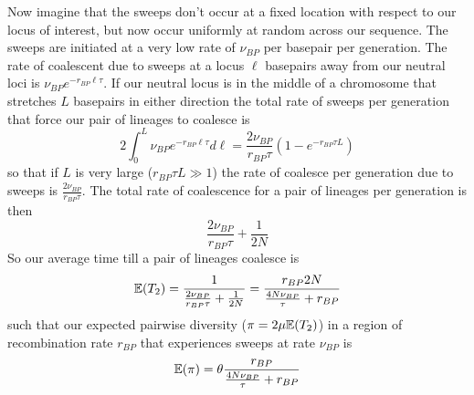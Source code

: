 Now imagine that the sweeps don't occur at a fixed location with
respect to our locus of interest, but now occur uniformly at random
across our sequence. The sweeps are initiated at a very low rate of
$\nu_{BP}$ per basepair per generation. The rate of coalescent due to
sweeps at a locus $\ell$ basepairs away from our neutral loci is
$\nu_{BP} e^{-r_{BP} \ell \tau}$. If our neutral locus is in the
middle of a chromosome that stretches $L$ basepairs in either direction
the total rate of sweeps per generation that force our pair of lineages to coalesce is
\begin{equation}
2\int_0^{L} \nu_{BP} e^{-r_{BP} \ell \tau} d \ell =
\frac{2\nu_{BP}}{r_{BP} \tau} \left(1-e^{-r_{BP} \tau L} \right)
\end{equation}
so that if $L$ is very large ($r_{BP} \tau L \gg 1$) the rate of coalesce per
generation due to sweeps is $\frac{2\nu_{BP}}{r_{BP} \tau}$. The total rate
of coalescence for a pair of lineages per generation is then
\begin{equation}
\frac{2\nu_{BP}}{r_{BP} \tau}+\frac{1}{2N}
\end{equation}
So our average time till a pair of lineages coalesce is
\begin{equation}
\mathbb{E}(T_2) = \frac{1}{\frac{2\nu_{BP}}{r_{BP} \tau}+\frac{1}{2N}} = \frac{r_{BP}2N}{\frac{4N\nu_{BP}}{ \tau}+r_{BP}}
\end{equation}
such that our expected pairwise diversity ($\pi=2\mu\mathbb{E}(T_2)$) in a region of
recombination rate $r_{BP}$ that experiences sweeps at rate $\nu_{BP}$
is  
\begin{equation}
\mathbb{E}(\pi) = \theta \frac{r_{BP}}{\frac{4N\nu_{BP}}{ \tau}+r_{BP}} \label{eqn:pi_GW_HH}
\end{equation}



